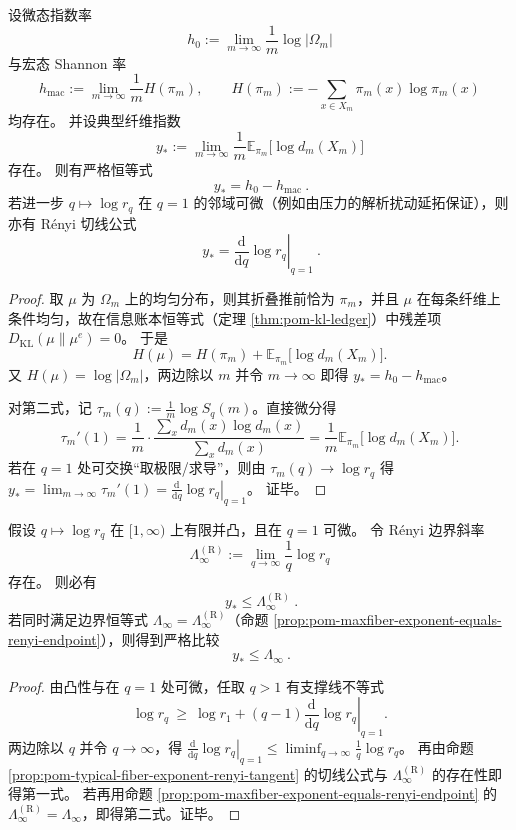 \begin{proposition}[纤维典型指数的 Rényi 切线公式：\texorpdfstring{$q=1$}{q=1} 处导数即平均信息损失率]\label{prop:pom-typical-fiber-exponent-renyi-tangent}
设微态指数率
\[
h_0:=\lim_{m\to\infty}\frac{1}{m}\log|\Omega_m|
\]
与宏态 Shannon 率
\[
h_{\mathrm{mac}}:=\lim_{m\to\infty}\frac{1}{m}H(\pi_m),
\qquad
H(\pi_m):=-\sum_{x\in X_m}\pi_m(x)\log\pi_m(x)
\]
均存在。
并设典型纤维指数
\[
y_\ast:=\lim_{m\to\infty}\frac{1}{m}\mathbb{E}_{\pi_m}\!\bigl[\log d_m(X_m)\bigr]
\]
存在。
则有严格恒等式
\[
\boxed{\ y_\ast=h_0-h_{\mathrm{mac}}\ }.
\]
若进一步 \(q\mapsto \log r_q\) 在 \(q=1\) 的邻域可微（例如由压力的解析扰动延拓保证），则亦有 Rényi 切线公式
\[
\boxed{\ y_\ast=\left.\frac{\mathrm d}{\mathrm dq}\log r_q\right|_{q=1}\ }.
\]
\end{proposition}
\begin{proof}
取 \(\mu\) 为 \(\Omega_m\) 上的均匀分布，则其折叠推前恰为 \(\pi_m\)，并且 \(\mu\) 在每条纤维上条件均匀，故在信息账本恒等式（定理 \ref{thm:pom-kl-ledger}）中残差项 \(D_{\mathrm{KL}}(\mu\|\mu^{e})=0\)。
于是
\[
H(\mu)=H(\pi_m)+\mathbb{E}_{\pi_m}\!\bigl[\log d_m(X_m)\bigr].
\]
又 \(H(\mu)=\log|\Omega_m|\)，两边除以 \(m\) 并令 \(m\to\infty\) 即得 \(y_\ast=h_0-h_{\mathrm{mac}}\)。
\par
对第二式，记 \(\tau_m(q):=\frac{1}{m}\log S_q(m)\)。直接微分得
\[
\tau_m'(1)=\frac{1}{m}\cdot\frac{\sum_{x}d_m(x)\log d_m(x)}{\sum_x d_m(x)}
=\frac{1}{m}\mathbb{E}_{\pi_m}\!\bigl[\log d_m(X_m)\bigr].
\]
若在 \(q=1\) 处可交换“取极限/求导”，则由 \(\tau_m(q)\to \log r_q\) 得
\(
y_\ast=\lim_{m\to\infty}\tau_m'(1)=\left.\frac{\mathrm d}{\mathrm dq}\log r_q\right|_{q=1}
\)。
证毕。
\end{proof}

\begin{proposition}[凸锥单调性：\texorpdfstring{$q\mapsto\log r_q$}{q->log rq} 的凸性强制 \texorpdfstring{$y_\ast\le\Lambda_\infty$}{y*<=Lambda_infty}]\label{prop:pom-convexity-forces-typical-le-worst}
假设 \(q\mapsto \log r_q\) 在 \([1,\infty)\) 上有限并凸，且在 \(q=1\) 可微。
令 Rényi 边界斜率
\[
\Lambda_\infty^{(\mathrm R)}:=\lim_{q\to\infty}\frac{1}{q}\log r_q
\]
存在。
则必有
\[
\boxed{\ y_\ast\le \Lambda_\infty^{(\mathrm R)}\ }.
\]
若同时满足边界恒等式 \(\Lambda_\infty=\Lambda_\infty^{(\mathrm R)}\)（命题 \ref{prop:pom-maxfiber-exponent-equals-renyi-endpoint}），则得到严格比较
\[
\boxed{\ y_\ast\le \Lambda_\infty\ }.
\]
\end{proposition}
\begin{proof}
由凸性与在 \(q=1\) 处可微，任取 \(q>1\) 有支撑线不等式
\[
\log r_q\ \ge\ \log r_1+(q-1)\left.\frac{\mathrm d}{\mathrm dq}\log r_q\right|_{q=1}.
\]
两边除以 \(q\) 并令 \(q\to\infty\)，得
\(
\left.\frac{\mathrm d}{\mathrm dq}\log r_q\right|_{q=1}\le \liminf_{q\to\infty}\frac{1}{q}\log r_q
\)。
再由命题 \ref{prop:pom-typical-fiber-exponent-renyi-tangent} 的切线公式与 \(\Lambda_\infty^{(\mathrm R)}\) 的存在性即得第一式。
若再用命题 \ref{prop:pom-maxfiber-exponent-equals-renyi-endpoint} 的 \(\Lambda_\infty^{(\mathrm R)}=\Lambda_\infty\)，即得第二式。证毕。
\end{proof}

